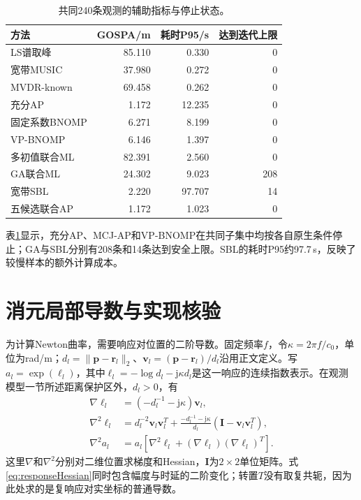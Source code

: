 \documentclass[a4paper,fleqn]{cas-sc}
\numberwithin{equation}{section}
\numberwithin{figure}{section}
\numberwithin{table}{section}
\begin{document}
\begin{table}[pos=H]\centering\small
\caption{共同240条观测的辅助指标与停止状态。}\label{tab:auxiliary}
\begin{tabular}{@{}lrrr@{}}\toprule
方法 & GOSPA/m & 耗时P95/s & 达到迭代上限\\\midrule
LS谱取峰 & 85.110 & 0.330 & 0\\
宽带MUSIC & 37.980 & 0.272 & 0\\
MVDR-known & 69.458 & 0.262 & 0\\
充分AP & 1.172 & 12.235 & 0\\
固定系数BNOMP & 6.271 & 8.199 & 0\\
VP-BNOMP & 6.146 & 1.397 & 0\\
多初值联合ML & 82.391 & 2.560 & 0\\
GA联合ML & 24.302 & 9.023 & 208\\
宽带SBL & 2.220 & 97.707 & 14\\
五候选联合AP & 1.172 & 1.023 & 0\\
\bottomrule\end{tabular}\end{table}


表\ref{tab:auxiliary}显示，充分AP、MCJ-AP和VP-BNOMP在共同子集中均按各自原生条件停止；GA与SBL分别有208条和14条达到安全上限。SBL的耗时P95约97.7\,s，反映了较慢样本的额外计算成本。

\section{消元局部导数与实现核验}\label{app:derivatives}
为计算Newton曲率，需要响应对位置的二阶导数。固定频率$f$，令$\kappa=2\pi f/c_0$，单位为rad/m；$d_l=\|\bm p-\bm r_l\|_2$、$\bm v_l=(\bm p-\bm r_l)/d_l$沿用正文定义。写$a_l=\exp(\ell_l)$，其中$\ell_l=-\log d_l-\mathrm j\kappa d_l$是这一响应的连续指数表示。在观测模型一节所述距离保护区外，$d_l>0$，有
\begin{align}
 \nabla\ell_l&=(-d_l^{-1}-\mathrm j\kappa)\bm v_l,\\
 \nabla^2\ell_l&=d_l^{-2}\bm v_l\bm v_l^T
 +\frac{-d_l^{-1}-\mathrm j\kappa}{d_l}
 (\bm I-\bm v_l\bm v_l^T),\\
 \nabla^2 a_l&=a_l[\nabla^2\ell_l+(\nabla\ell_l)(\nabla\ell_l)^T].\label{eq:responseHessian}
\end{align}
这里$\nabla$和$\nabla^2$分别对二维位置求梯度和Hessian，$\bm I$为$2\times2$单位矩阵。式\eqref{eq:responseHessian}同时包含幅度与时延的二阶变化；转置$T$没有取复共轭，因为此处求的是复响应对实坐标的普通导数。
\end{document}
